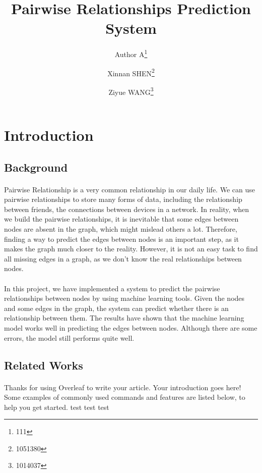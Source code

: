 \documentclass[fleqn,11pt]{olplainarticle}
\title{Pairwise Relationships Prediction System}
\author{Author A\thanks{111}}
\author{Xinnan SHEN\thanks{1051380}}
\author{Ziyue WANG\thanks{1014037}}
\affil{School of Computing and Information Systems, University of Melbourne}
\affil[]{\textit{\{aaa,xinnan.shen, ziyue2\}}@student.unimelb.edu.au}
\begin{document}
\maketitle
\flushbottom
\thispagestyle{empty}
\pagestyle{empty}


\section{Introduction}\label{intro}

\subsection{Background}\label{bgd}
\paragraph*{}
Pairwise Relationship is a very common relationship in our daily life. We can use pairwise relationships to store many forms of data, including the relationship between friends, the connections between devices in a network. In reality, when we build the pairwise relationships, it is inevitable that some edges between nodes are absent in the graph, which might mislead others a lot. Therefore, finding a way to predict the edges between nodes is an important step, as it makes the graph much closer to the reality. However, it is not an easy task to find all missing edges in a graph, as we don't know the real relationships between nodes. 
\paragraph*{}
In this project, we have implemented a system to predict the pairwise relationships between nodes by using machine learning tools. Given the nodes and some edges in the graph, the system can predict whether there is an relationship between them. The results have shown that the machine learning model works well in predicting the edges between nodes. Although there are some errors, the model still performs quite well.

\subsection{Related Works}\label{relaw}
\paragraph{}
Thanks for using Overleaf to write your article. Your introduction goes here! Some examples of commonly used commands and features are listed below, to help you get started. test \cite{liben2007link} test \cite{lu2011link} test
\end{document}
